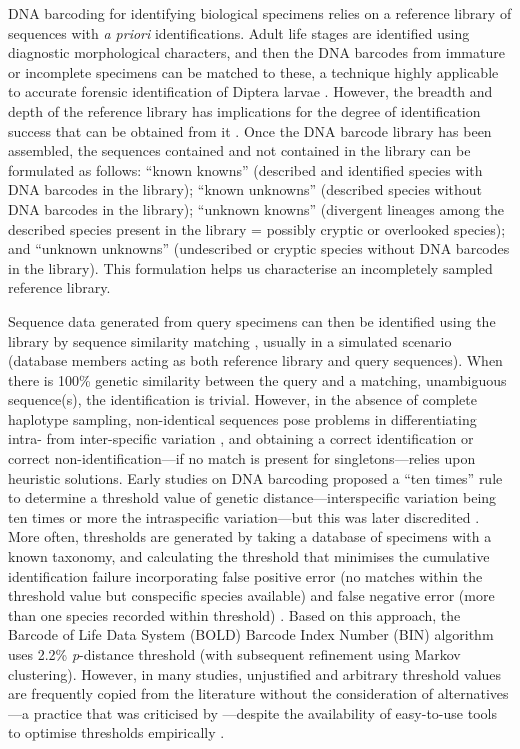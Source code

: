\documentclass[12pt]{article}
\begin{document}
DNA barcoding for identifying biological specimens relies on a reference library of sequences with \emph{a priori} identifications. Adult life stages are identified using diagnostic morphological characters, and then the DNA barcodes from immature or incomplete specimens can be matched to these, a technique highly applicable to accurate forensic identification of Diptera larvae \citep{Meiklejohn2011}. However, the breadth and depth of the reference library has implications for the degree of identification success that can be obtained from it \citep{Bergsten2012,Virgilio2012,Zhang2012b}. Once the DNA barcode library has been assembled, the sequences contained and not contained in the library can be formulated as follows: ``known knowns'' (described and identified species with DNA barcodes in the library); ``known unknowns'' (described species without DNA barcodes in the library); ``unknown knowns'' (divergent lineages among the described species present in the library = possibly cryptic or overlooked species); and ``unknown unknowns'' (undescribed or cryptic species without DNA barcodes in the library). This formulation helps us characterise an incompletely sampled reference library.

Sequence data generated from query specimens can then be identified using the library by sequence similarity matching \citep{Meier2006}, usually in a simulated scenario (database members acting as both reference library and query sequences). When there is 100\% genetic similarity between the query and a matching, unambiguous sequence(s), the identification is trivial. However, in the absence of complete haplotype sampling, non-identical sequences pose problems in differentiating intra- from inter-specific variation \citep{Virgilio2012}, and obtaining a correct identification or correct non-identification---if no match is present for singletons---relies upon heuristic solutions. Early studies on DNA barcoding \citep[e.g.][]{Hebert2004} proposed a ``ten times'' rule to determine a threshold value of genetic distance---interspecific variation being ten times or more the intraspecific variation---but this was later discredited \citep{Hickerson2006}. More often, thresholds are generated by taking a database of specimens with a known taxonomy, and calculating the threshold that minimises the cumulative identification failure incorporating false positive error (no matches within the threshold value but conspecific species available) and false negative error (more than one species recorded within threshold) \citep{Meyer2005}. Based on this approach, the Barcode of Life Data System (BOLD) Barcode Index Number (BIN) algorithm \citep{Ratnasingham2013} uses 2.2\% \emph{p}-distance threshold (with subsequent refinement using Markov clustering). However, in many studies, unjustified and arbitrary threshold values are frequently copied from the literature without the consideration of alternatives---a practice that was criticised by \citet{Collins2013}---despite the availability of easy-to-use tools to optimise thresholds empirically \citep{Brown2012,Puillandre2012b,Virgilio2012,Sonet2013}.
\end{document}
